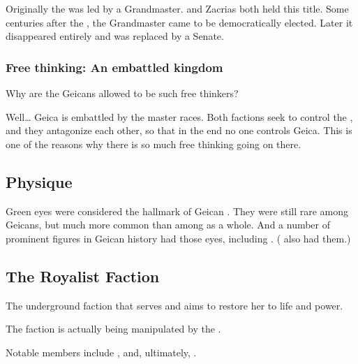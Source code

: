 Originally the \vclan was led by a Grandmaster. 
\Belzir{} and Zacrias both held this title. 
Some centuries after the \Darkfall, the Grandmaster came to be democratically elected. 
Later it disappeared entirely and was replaced by a Senate. 





\subsubsection{Free thinking: An embattled kingdom}
Why are the Geicans allowed to be such free thinkers? 

Well\ldots{} Geica is embattled by the master races. Both factions seek to control the \vclan {}, and they antagonize each other, so that in the end no one controls Geica. This is one of the reasons why there is so much free thinking going on there. 









\subsection{Physique}
Green eyes were considered the hallmark of Geican \humans.
They were still rare among Geicans, but much more common than among \humans as a whole.
And a number of prominent figures in Geican history had those eyes, including . 
( also had them.)









\subsection{The Royalist Faction}
The underground faction that serves  and aims to restore her to life and power. 

The faction is actually being manipulated by the . 

Notable members include ,  and, ultimately, . 















